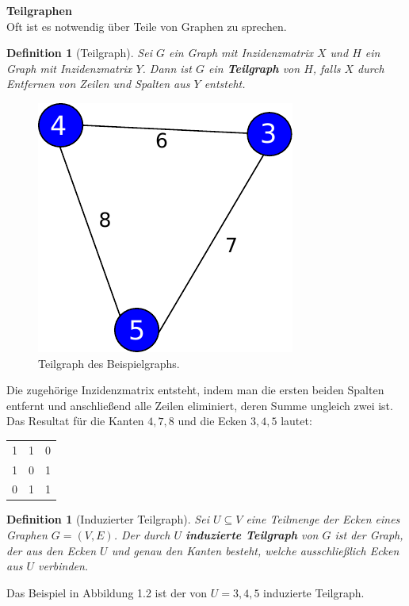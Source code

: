 \documentclass[11pt,a4paper,leqno]{report}
\newtheorem{definition}[theorem]{Definition}
\numberwithin{equation}{chapter}
\begin{document}
\noindent
\textbf{Teilgraphen}\\
Oft ist es notwendig \"uber Teile von Graphen zu sprechen. 
\begin{definition}[Teilgraph]
	Sei $G$ ein Graph mit Inzidenzmatrix $X$ und $H$ ein Graph mit Inzidenzmatrix $Y$. Dann ist $G$ ein \textbf{Teilgraph} von $H$, falls $X$ durch Entfernen von Zeilen und Spalten aus $Y$ entsteht.
\end{definition}
\begin{figure}[H]
	\begin{center}
		\includegraphics[scale=0.4]{Abbildungen/graph_1_teil.pdf}
		\caption{Teilgraph des Beispielgraphs.}
	\end{center}
\end{figure}
\noindent
Die zugehörige Inzidenzmatrix entsteht, indem man die ersten beiden Spalten entfernt und anschließend alle Zeilen eliminiert, deren Summe ungleich zwei ist. Das Resultat für die Kanten ${4,7,8}$ und die Ecken ${3,4,5}$ lautet:
	\begin{center}
	\begin{tabular}{c c c}
		1 & 1 & 0\\
		1 & 0 & 1\\
		0 & 1 & 1\\
	\end{tabular} 
\end{center}
\begin{definition}[Induzierter Teilgraph]
Sei $U \subseteq V$ eine Teilmenge der Ecken eines Graphen $G=(V,E)$. Der durch $U$ \textbf{induzierte Teilgraph} von $G$ ist der Graph, der aus den Ecken $U$ und genau den Kanten besteht, welche ausschließlich Ecken aus $U$ verbinden.
\end{definition}
Das Beispiel in Abbildung 1.2 ist der von $U={3,4,5}$ induzierte Teilgraph.\\
\end{document}
